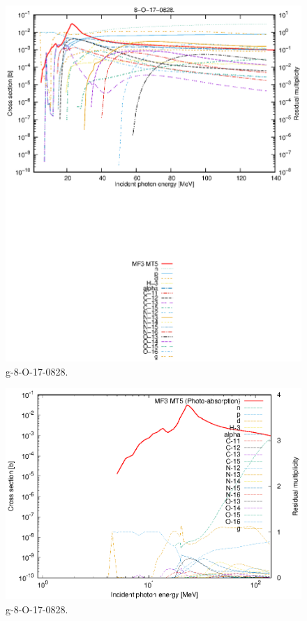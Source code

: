 \begin{figure}
 \includegraphics[width=\linewidth]{eps/g_8-O-17_0828.eps}
  \caption{g-8-O-17-0828.}
\end{figure}
\newpage \clearpage

\begin{figure}
 \includegraphics[width=\linewidth]{eps-log/g_8-O-17_0828.eps}
 \caption{g-8-O-17-0828.}
\end{figure}
\newpage \clearpage

